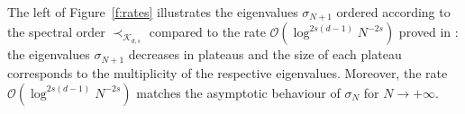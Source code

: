 \documentclass[twoside,11pt]{book}
\numberwithin{theorem}{chapter}
\numberwithin{definition}{chapter}
\numberwithin{proposition}{chapter}
\numberwithin{corollary}{chapter}
\numberwithin{example}{chapter}
\numberwithin{lemma}{chapter}
\numberwithin{assumption}{chapter}
\numberwithin{equation}{chapter}
\numberwithin{figure}{chapter}
\begin{document}
The left of Figure~\ref{f:rates} illustrates the eigenvalues $\sigma_{N+1}$ ordered according to the spectral order $\prec_{\mathcal{K}_{d,s}}$ compared to the rate $\mathcal{O}(\log^{2s(d-1)} N^{-2s})$ proved in \citep{Bac17}: the eigenvalues $\sigma_{N+1}$ decreases in plateaus and the size of each plateau corresponds to the multiplicity of the respective eigenvalues. Moreover, the rate $\mathcal{O}(\log^{2s(d-1)} N^{-2s})$ matches the asymptotic behaviour of $\sigma_{N}$ for $N \rightarrow +\infty$.



\end{document}

